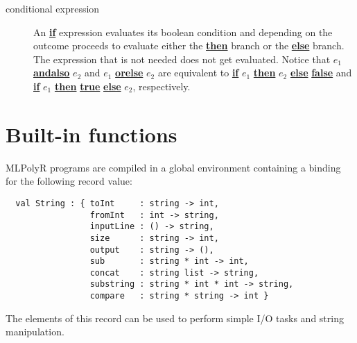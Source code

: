 \documentclass{article}
\newcommand{\tl}[1]{{\underline{\bf #1}}}
\begin{document}
\begin{description}
\item[conditional expression] An \tl{if} expression evaluates its
  boolean condition and depending on the outcome proceeds to evaluate
  either the \tl{then} branch or the \tl{else} branch.  The expression
  that is not needed does not get evaluated.  Notice that $e_1$
  \tl{andalso} $e_2$ and $e_1$ \tl{orelse} $e_2$ are equivalent to
  \tl{if} $e_1$ \tl{then} $e_2$ \tl{else} \tl{false} and \tl{if} $e_1$
  \tl{then} \tl{true} \tl{else} $e_2$, respectively.
   
\end{description}

\section{Built-in functions}

MLPolyR programs are compiled in a global environment containing
a binding for the following record value:

\begin{verbatim}
  val String : { toInt     : string -> int,
                 fromInt   : int -> string,
                 inputLine : () -> string,
                 size      : string -> int,
                 output    : string -> (),
                 sub       : string * int -> int,
                 concat    : string list -> string,
                 substring : string * int * int -> string,
                 compare   : string * string -> int }
\end{verbatim}

The elements of this record can be used to perform simple I/O tasks and
string manipulation.
\end{document}
